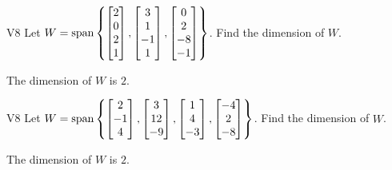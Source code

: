 \begin{problem}{V8}
Let \(
  W=\operatorname{span}\left\{
    \begin{bmatrix} 2 \\ 0 \\ 2 \\ 1 \end{bmatrix},
    \begin{bmatrix} 3 \\ 1 \\ -1 \\ 1 \end{bmatrix},
    \begin{bmatrix} 0 \\ 2 \\ -8 \\ -1 \end{bmatrix}
  \right\}
\). Find the dimension of \(W\).
\end{problem}
\begin{solution}
The dimension of \(W\) is \(2\).
\end{solution}





\begin{problem}{V8}
Let \(
  W=\operatorname{span}\left\{
    \begin{bmatrix} 2 \\ -1 \\ 4 \end{bmatrix},
    \begin{bmatrix} 3 \\ 12 \\ -9 \end{bmatrix},
    \begin{bmatrix} 1 \\ 4 \\ -3 \end{bmatrix},
    \begin{bmatrix} -4 \\ 2 \\ -8 \end{bmatrix}
  \right\}
\). Find the dimension of \(W\).
\end{problem}
\begin{solution}
The dimension of \(W\) is \(2\).
\end{solution}

